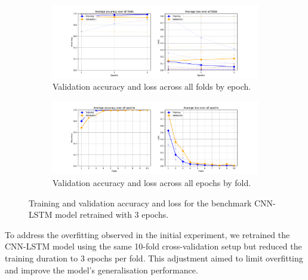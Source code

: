 \begin{figure}[p]
    \centering
    
    \begin{subfigure}[t]{\textwidth}
        \centering
        \includegraphics[trim={3cm 0 3cm 0.8cm},clip,width=\textwidth]{img/ch3/baseline_results/3_epochs_by_epoch.pdf}
        \caption{Validation accuracy and loss across all folds by epoch.}
        \label{fig:baseline3-by-epoch}
    \end{subfigure}
    
    \vspace{0.5cm}
    
    \begin{subfigure}[t]{\textwidth}
        \centering
        \includegraphics[trim={3cm 0 3cm 0.8cm},clip,width=\textwidth]{img/ch3/baseline_results/3_epochs_by_fold.pdf}
        \caption{Validation accuracy and loss across all epochs by fold.}
        \label{fig:baseline3-by-fold}
    \end{subfigure}
    
    \caption{Training and validation accuracy and loss for the benchmark CNN-LSTM model retrained with 3 epochs.}
    \label{fig:baseline3-acc-loss}
\end{figure}

To address the overfitting observed in the initial experiment, we retrained the CNN-LSTM model using the same 10-fold cross-validation setup but reduced the training duration to 3 epochs per fold. This adjustment aimed to limit overfitting and improve the model's generalisation performance.

